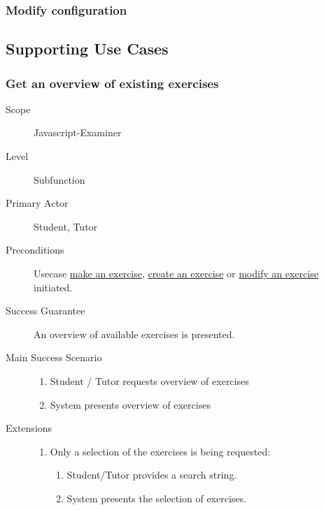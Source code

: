 \subsubsection{Modify configuration}
\newpage
\subsection{Supporting Use Cases}

\subsubsection{Get an overview of existing exercises}
\begin{mdframed} [rightmargin=-100pt]
\begin{description}
  \item[Scope] Javascript-Examiner
  \item[Level] Subfunction
  \item[Primary Actor] Student, Tutor
  \item[Preconditions] Usecase \underline{make an exercise}, 
							   \underline{create an exercise} or
							   \underline{modify an exercise} initiated.
  \item[Success Guarantee] An overview of available exercises is 
    presented.
  \item[Main Success Scenario] \mbox{}
    \begin{enumerate} 
	  \item Student / Tutor requests overview of exercises
	  \item System presents overview of exercises
	\end{enumerate}
  \item[Extensions] \mbox{}
    \begin{enumerate}
	  \renewcommand{\labelenumi}{\theenumi a.}
	  \item Only a selection of the exercises is being requested:
		\begin{enumerate}[(1)]
		  \renewcommand{\labelenumii}{\theenumii .}
		  \item Student/Tutor provides a search string.
		  \item System presents the selection of exercises.
		\end{enumerate}
	\end{enumerate}
\end{description}
\end{mdframed}

